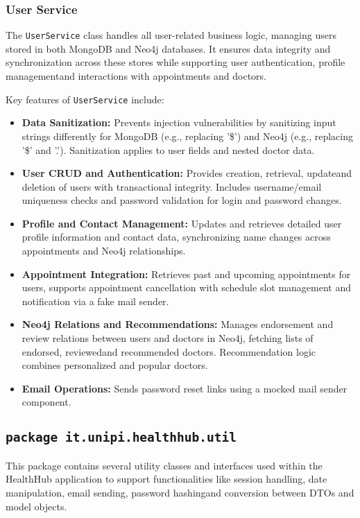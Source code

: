 \subsubsection{User Service}
The \texttt{UserService} class handles all user-related business logic, managing users stored in both MongoDB and Neo4j databases. It ensures data integrity and synchronization across these stores while supporting user authentication, profile managementand interactions with appointments and doctors.

Key features of \texttt{UserService} include:
\begin{itemize}
	\item \textbf{Data Sanitization:} Prevents injection vulnerabilities by sanitizing input strings differently for MongoDB (e.g., replacing '\$') and Neo4j (e.g., replacing '\$' and '.'). Sanitization applies to user fields and nested doctor data.

	\item \textbf{User CRUD and Authentication:} Provides creation, retrieval, updateand deletion of users with transactional integrity. Includes username/email uniqueness checks and password validation for login and password changes.  
	
	\item \textbf{Profile and Contact Management:} Updates and retrieves detailed user profile information and contact data, synchronizing name changes across appointments and Neo4j relationships.  
	
	\item \textbf{Appointment Integration:} Retrieves past and upcoming appointments for users, supports appointment cancellation with schedule slot management and notification via a fake mail sender.  
	
	\item \textbf{Neo4j Relations and Recommendations:} Manages endorsement and review relations between users and doctors in Neo4j, fetching lists of endorsed, reviewedand recommended doctors. Recommendation logic combines personalized and popular doctors.  
	
	\item \textbf{Email Operations:} Sends password reset links using a mocked mail sender component.  
\end{itemize}

\subsection{\texttt{package it.unipi.healthhub.util}}
This package contains several utility classes and interfaces used within the HealthHub application to support functionalities like session handling, date manipulation, email sending, password hashingand conversion between DTOs and model objects.

